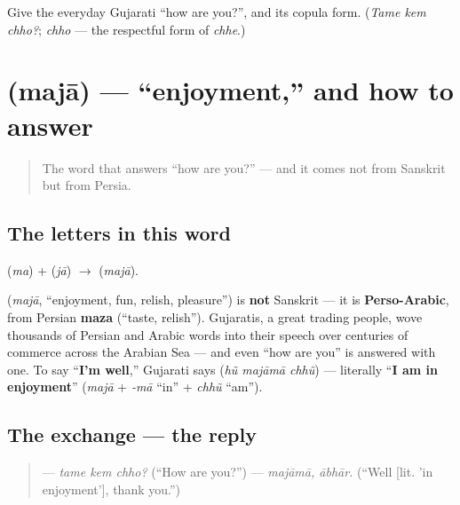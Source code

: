 \begin{tcolorbox}[breakable,colback=teal!4,colframe=teal!35!black,title={Before you move on}]
Give the everyday Gujarati \textquotedblleft{}how are you?\textquotedblright{}, and its copula form. (\emph{Tame kem chho?}; \emph{chho} — the respectful form of \emph{chhe}.)
\end{tcolorbox}
\section[\texorpdfstring{\gu{મજા} (majā)}{મજા (majā)}]{ (majā) — \textquotedblleft{}enjoyment,\textquotedblright{} and how to answer}

\label{lesson:GU-C03-majaa}



\begin{quote}
The word that answers \textquotedblleft{}how are you?\textquotedblright{} — and it comes not from Sanskrit but from Persia.
\end{quote}

\subsection*{The letters in this word}
\textbf{} (\emph{ma}) + \textbf{} (\emph{jā}) $\to$ \textbf{} (\emph{majā}).

\begin{cousinweb}
\textbf{} (\emph{majā}, \textquotedblleft{}enjoyment, fun, relish, pleasure\textquotedblright{}) is \textbf{not} Sanskrit — it is \textbf{Perso-Arabic}, from Persian \textbf{maza} (\textquotedblleft{}taste, relish\textquotedblright{}). Gujaratis, a great trading people, wove thousands of Persian and Arabic words into their speech over centuries of commerce across the Arabian Sea — and even \textquotedblleft{}how are you\textquotedblright{} is answered with one. To say \textquotedblleft{}\textbf{I'm well},\textquotedblright{} Gujarati says \textbf{  } (\emph{hũ majāmā chhũ}) — literally \textquotedblleft{}\textbf{I am in enjoyment}\textquotedblright{} (\emph{majā} + \emph{-mā} \textquotedblleft{}in\textquotedblright{} + \emph{chhũ} \textquotedblleft{}am\textquotedblright{}).
\end{cousinweb}

\subsection*{The exchange — the reply}
\begin{quote}
— \emph{tame kem chho?} (\textquotedblleft{}How are you?\textquotedblright{}) — \emph{majāmā, ābhār.} (\textquotedblleft{}Well {[}lit. 'in enjoyment'{]}, thank you.\textquotedblright{})
\end{quote}

